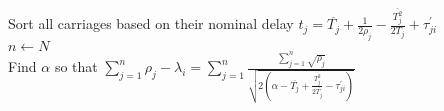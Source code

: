 \documentclass[journal]{IEEEtran}
\begin{document}
{\begin{algorithm}
	Sort all carriages based on their nominal delay $t_j=\overline{T_j} + \frac{1}{2\rho_{j}} - \frac{\overline{T_j^2}}{2T_j} + \tau_{ji}^{'}$\;\\ 
	$ n \leftarrow N$\;  \\
	Find $\alpha$ so that 
	$\sum_{j=1}^{n} \rho_{j} -\lambda_i = \sum_{j=1}^{n} \frac{\sum_{j=1}^{n} \sqrt{\rho_{j}}}{\sqrt{2(\alpha -\overline{T_{j}}+\frac{\overline{T_{j}^2}}{2\overline{T_j}} - \tau_{ji}^{'})}}$ \; \\
	
	
	
	\;
	\label{DOA}
\end{algorithm}

}
\end{document}
